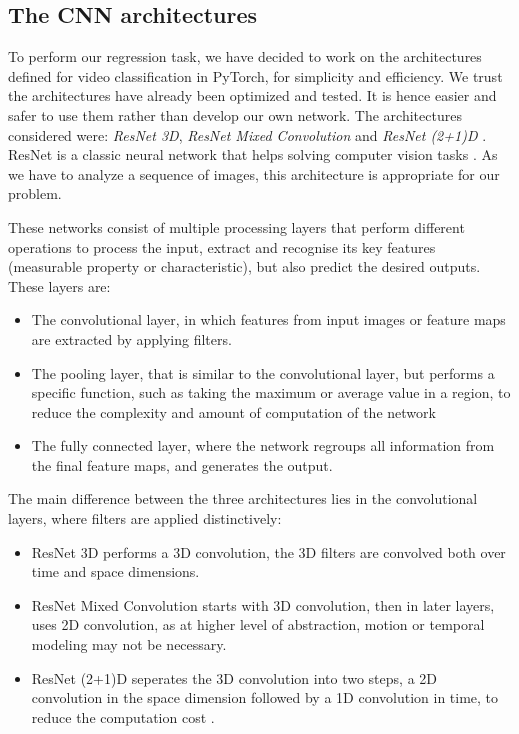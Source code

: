 \documentclass[10pt,conference]{IEEEtran}
\begin{document}
\subsection{The CNN architectures}
To perform our regression task, we have decided to work on the architectures defined for video classification in PyTorch, for simplicity and efficiency. We trust the architectures have already been optimized and tested. It is hence easier and safer to use them rather than develop our own network. The architectures considered were: \textit{ResNet 3D}, \textit{ResNet Mixed Convolution} and \textit{ResNet (2+1)D} \cite{resnets}. ResNet is a classic neural network that helps solving computer vision tasks \cite{hara3dcnns}. As we have to analyze a sequence of images, this architecture is appropriate for our problem.\par
These networks consist of multiple processing layers that perform different operations to process the input, extract and recognise its key features (measurable property or characteristic), but also predict the desired outputs. These layers are:
\begin{itemize}
  \item The convolutional layer, in which features from input images or feature maps are extracted by applying filters.
  \item The pooling layer, that is similar to the convolutional layer, but performs a specific function, such as taking the maximum or average value in a region, to reduce the complexity and amount of computation of the network 
  \item The fully connected layer, where the network regroups all information from the final feature maps, and generates the output.
\end{itemize}

The main difference between the three architectures lies in the convolutional layers, where filters are applied distinctively:
\begin{itemize}
  \item ResNet 3D performs a 3D convolution, the 3D filters are convolved both over time and space dimensions.
  \item ResNet Mixed Convolution starts with 3D convolution, then in later layers, uses 2D convolution, as at higher level of abstraction, motion or temporal modeling may not be necessary.
  \item ResNet (2+1)D seperates the 3D convolution into two steps, a 2D convolution in the space dimension followed by a 1D convolution in time, to reduce the computation cost \cite{spacetimeconv}.
\end{itemize}
\end{document}
